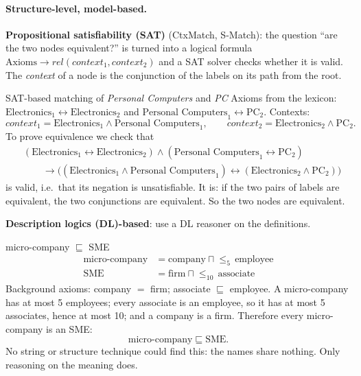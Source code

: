 \paragraph{Structure-level, model-based.}
\textbf{Propositional satisfiability (SAT)} (CtxMatch, S-Match): the question ``are the
two nodes equivalent?'' is turned into a logical formula
$\text{Axioms} \to rel(context_1, context_2)$ and a SAT solver checks whether it is valid.
The \emph{context} of a node is the conjunction of the labels on its path from the root.

\begin{nbexample}{SAT-based matching of \emph{Personal Computers} and \emph{PC}}
Axioms from the lexicon: $\text{Electronics}_1 \leftrightarrow \text{Electronics}_2$ and
$\text{Personal Computers}_1 \leftrightarrow \text{PC}_2$. Contexts:
\[
  context_1 = \text{Electronics}_1 \wedge \text{Personal Computers}_1, \qquad
  context_2 = \text{Electronics}_2 \wedge \text{PC}_2.
\]
To prove equivalence we check that
\begin{align*}
  &(\text{Electronics}_1 \leftrightarrow \text{Electronics}_2) \wedge
   (\text{Personal Computers}_1 \leftrightarrow \text{PC}_2) \\
  &\qquad \to \bigl((\text{Electronics}_1 \wedge \text{Personal Computers}_1)
   \leftrightarrow (\text{Electronics}_2 \wedge \text{PC}_2)\bigr)
\end{align*}
is valid, i.e.\ that its negation is unsatisfiable. It is: if the two pairs of labels
are equivalent, the two conjunctions are equivalent. So the two nodes are equivalent.
\end{nbexample}

\textbf{Description logics (DL)-based}: use a DL reasoner on the definitions.

\begin{nbexample}{micro-company $\sqsubseteq$ SME}
\begin{align*}
  \text{micro-company} &= \text{company} \sqcap {\le_5}\,\text{employee}\\
  \text{SME} &= \text{firm} \sqcap {\le_{10}}\,\text{associate}
\end{align*}
Background axioms: company $=$ firm; associate $\sqsubseteq$ employee. A micro-company
has at most 5 employees; every associate is an employee, so it has at most 5 associates,
hence at most 10; and a company is a firm. Therefore every micro-company is an SME:
\[
  \text{micro-company} \sqsubseteq \text{SME}.
\]
No string or structure technique could find this: the names share nothing. Only
reasoning on the meaning does.
\end{nbexample}

